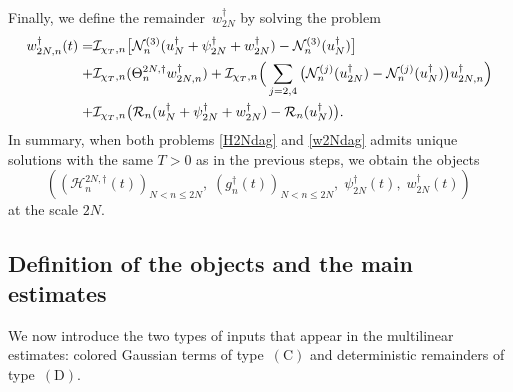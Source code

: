 \documentclass[11pt,reqno,english]{amsart}
\numberwithin{equation}{section}
\theoremstyle{plain}
\theoremstyle{definition}
\theoremstyle{remark}
\begin{document}
Finally, we define the remainder~$w_{2N}^{\dag}$ by solving the problem
\begin{align}\label{w2Ndag}
	w_{2N,n}^{\dag}(t)=&
	\mathcal{I}_{\chi_T,n}\big[
	\mathcal{N}^{(3)}_n(u^{\dag}_N+\psi_{2N}^{\dag}+w^{\dag}_{2N})-\mathcal{N}^{(3)}_{n}(u^{\dag}_N)
	\big]\notag \\+
	& \mathcal{I}_{\chi_T,n}(\Theta^{2N,\dag}_{n} w^{\dag}_{2N,n})
	+\mathcal{I}_{\chi_T,n}\Big(
	\sum_{j=2,4}\big(\mathcal{N}_{n}^{(j)}(u_{2N}^{\dag})-\mathcal{N}_{n}^{(j)}(u_N^{\dag})  \big)
	u^{\dag}_{2N,n} \Big)\notag \\ +&\mathcal{I}_{\chi_T,n}\big(\mathcal{R}_{n}(u_N^{\dag}+\psi_{2N}^{\dag}+w_{2N}^{\dag}) -\mathcal{R}_{n}(u_N^{\dag})  \big).
\end{align}
In summary, when 
both problems \eqref{H2Ndag} and \eqref{w2Ndag} admits unique solutions with the same $T>0$ as in the previous steps, 
we obtain the objects
\[
((\mathcal{H}^{2N,\dag}_n(t))_{N<n\leq 2N},\; (g^{\dag}_n(t))_{N<n\leq 2N} ,\; \psi^{\dag}_{2N}(t),\; w^{\dag}_{2N}(t))\,
\]
at the scale $2N$.

\subsection{Definition of the objects and the main estimates}

We now introduce the two types of inputs that appear in the multilinear estimates: colored Gaussian terms of type~$\mathrm{(C)}$ and deterministic remainders of type~$\mathrm{(D)}$.
\end{document}
